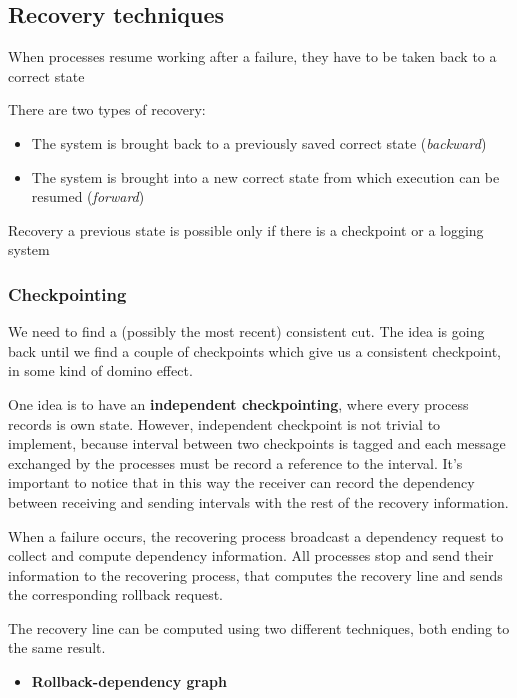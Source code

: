 \subsection{Recovery techniques}\label{recovery-techniques}

When processes resume working after a failure, they have to be taken
back to a correct state

There are two types of recovery:

\begin{itemize}
\itemsep1pt\parskip0pt
\item
  The system is brought back to a previously saved correct state
  (\emph{backward})
\item
  The system is brought into a new correct state from which execution
  can be resumed (\emph{forward})
\end{itemize}

Recovery a previous state is possible only if there is a checkpoint or a
logging system

\subsubsection{Checkpointing}\label{checkpointing}

We need to find a (possibly the most recent) consistent cut. The idea is
going back until we find a couple of checkpoints which give us a
consistent checkpoint, in some kind of domino effect.

One idea is to have an \textbf{independent checkpointing}, where every
process records is own state. However, independent checkpoint is not
trivial to implement, because interval between two checkpoints is tagged
and each message exchanged by the processes must be record a reference
to the interval. It's important to notice that in this way the receiver
can record the dependency between receiving and sending intervals with
the rest of the recovery information.

When a failure occurs, the recovering process broadcast a dependency
request to collect and compute dependency information. All processes
stop and send their information to the recovering process, that computes
the recovery line and sends the corresponding rollback request.

The recovery line can be computed using two different techniques, both
ending to the same result.

\begin{itemize}
\itemsep1pt\parskip0pt
\item
  \textbf{Rollback-dependency graph}
\end{itemize}

